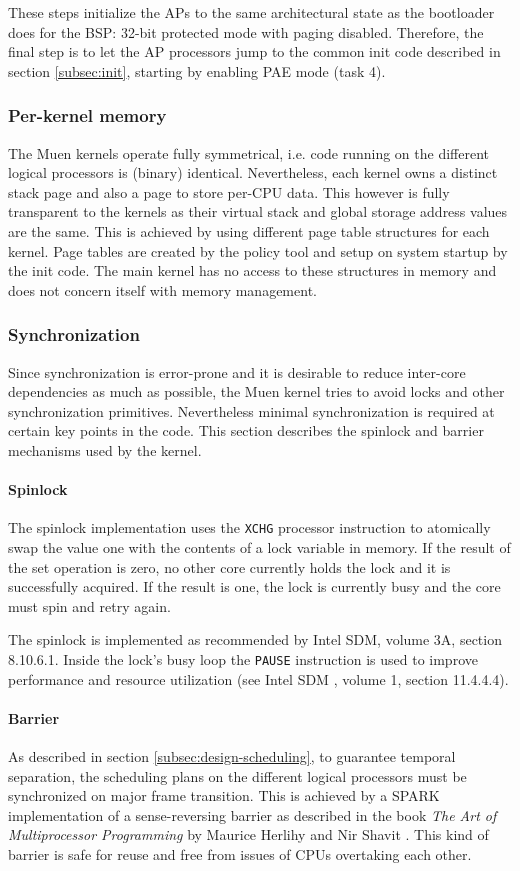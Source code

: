 These steps initialize the APs to the same architectural state as the
bootloader does for the BSP: 32-bit protected mode with paging disabled.
Therefore, the final step is to let the AP processors jump to the common init
code described in section \ref{subsec:init}, starting by enabling PAE mode
(task 4).

\subsubsection{Per-kernel memory}
The Muen kernels operate fully symmetrical, i.e. code running on the different
logical processors is (binary) identical. Nevertheless, each kernel owns a
distinct stack page and also a page to store per-CPU data. This however is fully
transparent to the kernels as their virtual stack and global storage address
values are the same. This is achieved by using different page table structures
for each kernel. Page tables are created by the policy tool and setup on system
startup by the init code. The main kernel has no access to these structures in
memory and does not concern itself with memory management.

\subsubsection{Synchronization} Since synchronization is error-prone and it is
desirable to reduce inter-core dependencies as much as possible, the Muen
kernel tries to avoid locks and other synchronization primitives. Nevertheless
minimal synchronization is required at certain key points in the code. This
section describes the spinlock and barrier mechanisms used by the kernel.

\paragraph{Spinlock}
The spinlock implementation uses the \texttt{XCHG} processor instruction to
atomically swap the value one with the contents of a lock variable in memory.
If the result of the set operation is zero, no other core currently holds the
lock and it is successfully acquired. If the result is one, the lock is
currently busy and the core must spin and retry again.

The spinlock is implemented as recommended by Intel SDM, volume 3A, section
8.10.6.1. Inside the lock's busy loop the \texttt{PAUSE} instruction is used to
improve performance and resource utilization (see Intel SDM \cite{IntelSDM},
volume 1, section 11.4.4.4).

\paragraph{Barrier}
As described in section \ref{subsec:design-scheduling}, to guarantee temporal
separation, the scheduling plans on the different logical processors must be
synchronized on major frame transition. This is achieved by a SPARK
implementation of a sense-reversing barrier as described in the book \emph{The
Art of Multiprocessor Programming} by Maurice Herlihy and Nir Shavit
\cite{Herlihy:2008:AMP:1734069}. This kind of barrier is safe for reuse and free
from issues of CPUs overtaking each other.
